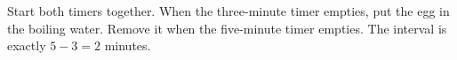 Start both timers together. When the three-minute timer empties, put the egg in the boiling water. Remove it when the five-minute timer empties. The interval is exactly $ 5-3=\boxed2 $ minutes.
